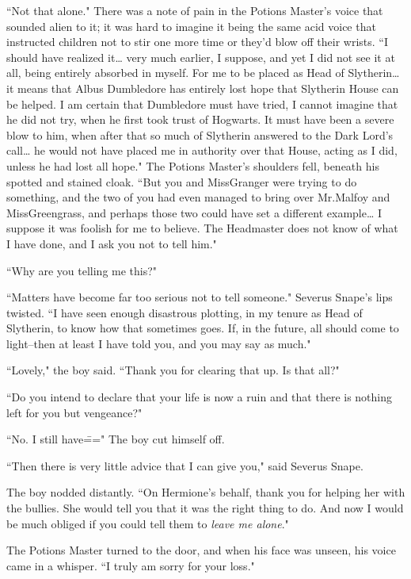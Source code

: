 ``Not that alone." There was a note of pain in the Potions Master's voice that sounded alien to it; it was hard to imagine it being the same acid voice that instructed children not to stir one more time or they'd blow off their wrists. ``I should have realized it{\ldots} very much earlier, I suppose, and yet I did not see it at all, being entirely absorbed in myself. For me to be placed as Head of Slytherin{\ldots} it means that Albus Dumbledore has entirely lost hope that Slytherin House can be helped. I am certain that Dumbledore must have tried, I cannot imagine that he did not try, when he first took trust of Hogwarts. It must have been a severe blow to him, when after that so much of Slytherin answered to the Dark Lord's call{\ldots} he would not have placed me in authority over that House, acting as I did, unless he had lost all hope." The Potions Master's shoulders fell, beneath his spotted and stained cloak. ``But you and Miss\?Granger were trying to do something, and the two of you had even managed to bring over Mr.\?Malfoy and Miss\?Greengrass, and perhaps those two could have set a different example{\ldots} I suppose it was foolish for me to believe. The Headmaster does not know of what I have done, and I ask you not to tell him."

``Why are you telling me this?"

``Matters have become far too serious not to tell someone." Severus Snape's lips twisted. ``I have seen enough disastrous plotting, in my tenure as Head of Slytherin, to know how that sometimes goes. If, in the future, all should come to light\---then at least I have told you, and you may say as much."

``Lovely," the boy said. ``Thank you for clearing that up. Is that all?"

``Do you intend to declare that your life is now a ruin and that there is nothing left for you but vengeance?"

``No. I still have\===" The boy cut himself off.

``Then there is very little advice that I can give you," said Severus Snape.

The boy nodded distantly. ``On Hermione's behalf, thank you for helping her with the bullies. She would tell you that it was the right thing to do. And now I would be much obliged if you could tell them to \emph{leave me alone}."

The Potions Master turned to the door, and when his face was unseen, his voice came in a whisper. ``I truly am sorry for your loss."

